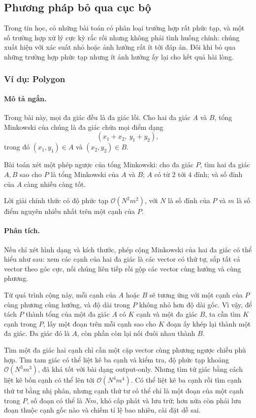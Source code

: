 \documentclass[11pt]{article}
\newcommand{\Oh}{\mathcal{O}}
\begin{document}
\subsection{Phương pháp bỏ qua cục bộ}

Trong tin học, có những bài toán có phân loại trường hợp rất phức tạp, và một
số trường hợp xử lý cực kỳ rắc rối nhưng không phải tình huống chính: chúng
xuất hiện với xác suất nhỏ hoặc ảnh hưởng rất ít tới đáp án. Đôi khi bỏ qua
những trường hợp phức tạp nhưng ít ảnh hưởng ấy lại cho kết quả hài lòng.

\subsubsection{Ví dụ: Polygon}

\paragraph{Mô tả ngắn.}
Trong bài này, mọi đa giác đều là đa giác lồi. Cho hai đa giác $A$ và $B$,
tổng Minkowski của chúng là đa giác chứa mọi điểm dạng
\[
  (x_1+x_2,\ y_1+y_2),
\]
trong đó $(x_1,y_1)\in A$ và $(x_2,y_2)\in B$.

Bài toán xét một phép ngược của tổng Minkowski: cho đa giác $P$, tìm hai đa
giác $A,B$ sao cho $P$ là tổng Minkowski của $A$ và $B$; $A$ có từ $2$ tới
$4$ đỉnh; và số đỉnh của $A$ càng nhiều càng tốt.

Lời giải chính thức có độ phức tạp $\Oh(N^2m^2)$, với $N$ là số đỉnh của $P$
và $m$ là số điểm nguyên nhiều nhất trên một cạnh của $P$.

\paragraph{Phân tích.}
Nếu chỉ xét hình dạng và kích thước, phép cộng Minkowski của hai đa giác có
thể hiểu như sau: xem các cạnh của hai đa giác là các vector có thứ tự, sắp
tất cả vector theo góc cực, nối chúng liên tiếp rồi gộp các vector cùng hướng
và cùng phương.

Từ quá trình cộng này, mỗi cạnh của $A$ hoặc $B$ sẽ tương ứng với một cạnh của
$P$ cùng phương cùng hướng, và độ dài trong $P$ không nhỏ hơn độ dài gốc. Vì
vậy, để tách $P$ thành tổng của một đa giác $A$ có $K$ cạnh và một đa giác
$B$, ta cần tìm $K$ cạnh trong $P$, lấy một đoạn trên mỗi cạnh sao cho $K$
đoạn ấy khép lại thành một đa giác. Đa giác đó là $A$, còn phần còn lại nối
đuôi nhau thành $B$.

Tìm một đa giác hai cạnh chỉ cần một cặp vector cùng phương ngược chiều phù
hợp. Tìm tam giác có thể liệt kê ba cạnh và kiểm tra, độ phức tạp khoảng
$\Oh(N^3m^3)$, đã khá tốt với bài dạng output-only. Nhưng tìm tứ giác bằng
cách liệt kê bốn cạnh có thể lên tới $\Oh(N^4m^4)$. Có thể liệt kê ba cạnh
rồi tìm cạnh thứ tư bằng nhị phân, nhưng cạnh thứ tư có thể chỉ là một đoạn
của một cạnh trong $P$, số đoạn có thể là $Nm$, khó cấp phát và lưu trữ; hơn
nữa còn phải lưu đoạn thuộc cạnh gốc nào và chiếm tỉ lệ bao nhiêu, cài đặt dễ
sai.
\end{document}
